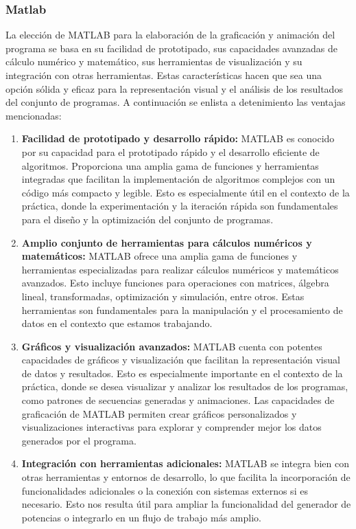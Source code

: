 \documentclass{article}
\begin{document}
        \subsubsection{Matlab}
        La elección de MATLAB para la elaboración de la graficación y animación del programa se basa en su facilidad de prototipado, sus capacidades
        avanzadas de cálculo numérico y matemático, sus herramientas de visualización y su integración con otras herramientas. Estas
        características hacen que sea una opción sólida y eficaz para la representación visual y el análisis de los resultados del
        conjunto de programas. A continuación se enlista a detenimiento las ventajas mencionadas:

        \begin{enumerate}
            \item \textbf{Facilidad de prototipado y desarrollo rápido:} MATLAB es conocido por su capacidad para el prototipado rápido y
            el desarrollo eficiente de algoritmos. Proporciona una amplia gama de funciones y herramientas integradas que facilitan la
            implementación de algoritmos complejos con un código más compacto y legible. Esto es especialmente útil en el contexto de la
            práctica, donde la experimentación y la iteración rápida son fundamentales para el diseño y la optimización del conjunto de
            programas.

            \item \textbf{Amplio conjunto de herramientas para cálculos numéricos y matemáticos:} MATLAB ofrece una amplia gama de
            funciones y herramientas especializadas para realizar cálculos numéricos y matemáticos avanzados. Esto incluye funciones para
            operaciones con matrices, álgebra lineal, transformadas, optimización y simulación, entre otros. Estas herramientas son
            fundamentales para la manipulación y el procesamiento de datos en el contexto que estamos trabajando.

            \item \textbf{Gráficos y visualización avanzados:} MATLAB cuenta con potentes capacidades de gráficos y visualización que
            facilitan la representación visual de datos y resultados. Esto es especialmente importante en el contexto de la práctica,
            donde se desea visualizar y analizar los resultados de los programas, como patrones de secuencias generadas y animaciones.
            Las capacidades de graficación de MATLAB permiten crear gráficos personalizados y visualizaciones interactivas para
            explorar y comprender mejor los datos generados por el programa.

            \item \textbf{Integración con herramientas adicionales:} MATLAB se integra bien con otras herramientas y entornos de desarrollo,
            lo que facilita la incorporación de funcionalidades adicionales o la conexión con sistemas externos si es necesario. Esto
            nos resulta útil para ampliar la funcionalidad del generador de potencias o integrarlo en un flujo de trabajo más amplio.
        \end{enumerate}
\end{document}
